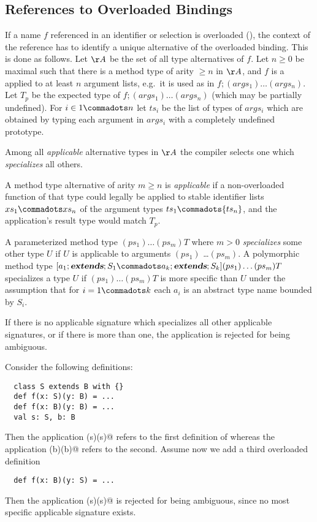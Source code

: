 \documentclass[11pt]{report}
\begin{document}
\subsection{References to Overloaded Bindings}
\label{sec:overloaded-refs}

If a name $f$ referenced in an identifier or selection is overloaded
(), the context of the reference has to
identify a unique alternative of the overloaded binding. This is done
as follows. Let $\AA$ be the set of all type alternatives of $f$. Let
$n \geq 0$ be maximal such that there is a method type of arity $\geq
n$ in $\AA$, and $f$ is a applied to at least $n$ argument lists,
e.g.\ it is used as in $f;(args_1) \ldots (args_n)$.  Let $T_p$ be the
expected type of $f;(args_1) \ldots (args_n)$ (which may be partially
undefined).  For $i \in 1 \commadots n$ let ${ts_i}$ be the list of
types of ${args_i}$ which are obtained by typing each argument in
${args_i}$ with a completely undefined prototype.

Among all {\em applicable} alternative types in $\AA$ the compiler
selects one which {\em specializes} all others.

A method type alternative of arity $m \geq n$ is {\em applicable} if a
non-overloaded function of that type could legally be applied to
stable identifier lists ${xs_1} \commadots xs_n$ of the argument types
${ts_1}
\commadots {ts_n}$, and the application's result type would match
$T_p$.

A parameterized method type $(ps_1)
\ldots (ps_m) T$ where $m > 0$ {\em specializes} some other
type $U$ if $U$ is applicable to arguments $(ps_1)$ \ldots $(ps_m)$.
A polymorphic method type $[a_1
\extends S_1
\commadots a_k \extends S_k] (ps_1) \ldots (ps_m) T$ specializes
a type $U$ if $(ps_1) \ldots (ps_m) T$ is more
specific than $U$ under the assumption that for $i = 1 \commadots k$
each $a_i$ is an abstract type name bounded by $S_i$.

If there is no applicable signature which specializes all other
applicable signatures, or if there is more than one, the application
is rejected for being ambiguous.

\example Consider the following definitions:

\begin{verbatim}
  class S extends B with {}
  def f(x: S)(y: B) = ...
  def f(x: B)(y: B) = ...
  val s: S, b: B
\end{verbatim}
Then the application \verb@f(s)(s)@ refers to the first
definition of \verb@f@ whereas the application \verb@f(b)(b)@
refers to the second.  Assume now we add a third overloaded definition
\begin{verbatim}
  def f(x: B)(y: S) = ...
\end{verbatim}
Then the application \verb@f(s)(s)@ is rejected for being ambiguous, since
 no most specific applicable signature exists.
\end{document}
